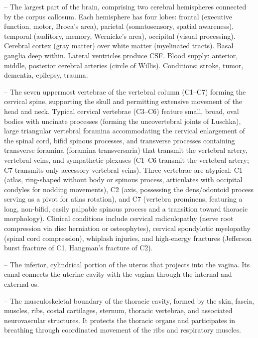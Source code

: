 -- The largest part of the brain, comprising two cerebral hemispheres connected by the corpus callosum. Each hemisphere has four lobes: frontal (executive function, motor, Broca's area), parietal (somatosensory, spatial awareness), temporal (auditory, memory, Wernicke's area), occipital (visual processing). Cerebral cortex (gray matter) over white matter (myelinated tracts). Basal ganglia deep within. Lateral ventricles produce CSF. Blood supply: anterior, middle, posterior cerebral arteries (circle of Willis). Conditions: stroke, tumor, dementia, epilepsy, trauma.

-- The seven uppermost vertebrae of the vertebral column (C1--C7) forming the cervical spine, supporting the skull and permitting extensive movement of the head and neck. Typical cervical vertebrae (C3--C6) feature small, broad, oval bodies with uncinate processes (forming the uncovertebral joints of Luschka), large triangular vertebral foramina accommodating the cervical enlargement of the spinal cord, bifid spinous processes, and transverse processes containing transverse foramina (foramina transversaria) that transmit the vertebral artery, vertebral veins, and sympathetic plexuses (C1--C6 transmit the vertebral artery; C7 transmits only accessory vertebral veins). Three vertebrae are atypical: C1 (atlas, ring-shaped without body or spinous process, articulates with occipital condyles for nodding movements), C2 (axis, possessing the dens/odontoid process serving as a pivot for atlas rotation), and C7 (vertebra prominens, featuring a long, non-bifid, easily palpable spinous process and a transition toward thoracic morphology). Clinical conditions include cervical radiculopathy (nerve root compression via disc herniation or osteophytes), cervical spondylotic myelopathy (spinal cord compression), whiplash injuries, and high-energy fractures (Jefferson burst fracture of C1, Hangman's fracture of C2).

-- The inferior, cylindrical portion of the uterus that projects into the vagina. Its canal connects the uterine cavity with the vagina through the internal and external os.

-- The musculoskeletal boundary of the thoracic cavity, formed by the skin, fascia, muscles, ribs, costal cartilages, sternum, thoracic vertebrae, and associated neurovascular structures. It protects the thoracic organs and participates in breathing through coordinated movement of the ribs and respiratory muscles.

